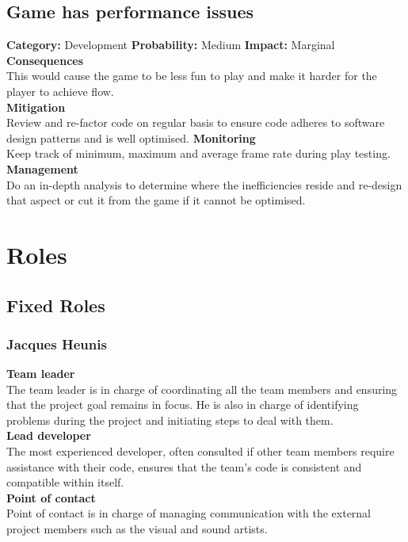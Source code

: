 \documentclass[a4paper,10pt]{article}
\begin{document}
		\subsection{Game has performance issues}
		\textbf{Category:} Development\newline
		\textbf{Probability:} Medium\newline
		\textbf{Impact:} Marginal
		\\\textbf{Consequences}\\
		This would cause the game to be less fun to play and make it harder for the player to achieve flow.
		\smallskip\\\textbf{Mitigation}\\
		Review and re-factor code on regular basis to ensure code adheres to software design patterns and is well optimised.
		\smallskip\textbf{Monitoring}\\
		Keep track of minimum, maximum and average frame rate during play testing.
		\smallskip\\\textbf{Management}\\
		Do an in-depth analysis to determine where the inefficiencies reside and re-design that aspect or cut it from the game if it cannot be optimised.

		\section{Roles}
		\subsection{Fixed Roles}
		\subsubsection{Jacques Heunis}
		\textbf{Team leader}\\
		The team leader is in charge of coordinating all the team members and ensuring that the project goal remains in focus. He is also in charge of identifying problems during the project and initiating steps to deal with them.
		\smallskip\\
		\textbf{Lead developer}\\
		The most experienced developer, often consulted if other team members require assistance with their code, ensures that the team's code is consistent and compatible within itself.
		\smallskip\\
		\textbf{Point of contact}\\
		Point of contact is in charge of managing communication with the external project members such as the visual and sound artists.
\end{document}
